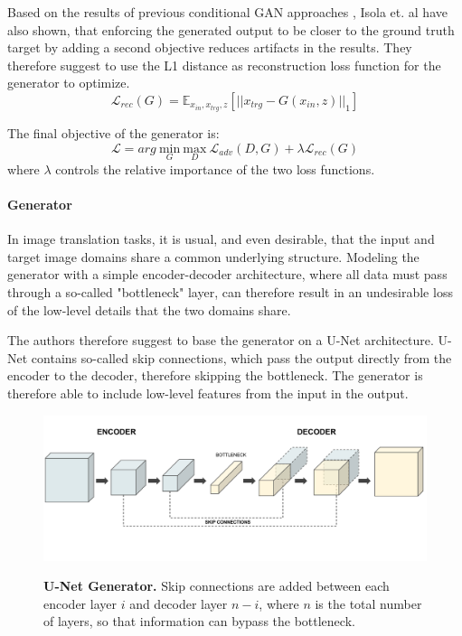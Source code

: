 \documentclass{article}
\begin{document}
Based on the results of previous conditional GAN approaches \cite{pathak_context_2016}, Isola et. al \cite{isola_image--image_2016} have also shown, that enforcing the generated output to be closer to the ground truth target by adding a second objective reduces artifacts in the results. They therefore suggest to use the L1 distance as reconstruction loss function for the generator to optimize.
\begin{equation}
\mathcal{L}_{rec}(G) = \mathbb{E}_{x_{in},x_{trg},z}[||x_{trg}-G(x_{in},z)||_{1}]
\label{eq:pix2pix_loss_rec}
\end{equation}

The final objective of the generator is:
\begin{equation}
\mathcal{L} = arg \ \underset{G}{\mathrm{min}} \ \underset{D}{\mathrm{max}} \ \mathcal{L}_{adv}(D,G) + \lambda \mathcal{L}_{rec}(G)
\end{equation}
where $\lambda$ controls the relative importance of the two loss functions.


\paragraph{Generator}
In image translation tasks, it is usual, and even desirable, that the input and target image domains share a common underlying structure. Modeling the generator with a simple encoder-decoder architecture, where all data must pass through a so-called "bottleneck" layer, can therefore result in an undesirable loss of the low-level details that the two domains share. 

The authors therefore suggest to base the generator on a U-Net architecture. U-Net contains so-called skip connections, which pass the output directly from the encoder to the decoder, therefore skipping the bottleneck. The generator is therefore able to include low-level features from the input in the output.

\begin{figure}[h]
\centering
{\includegraphics[width=\linewidth]{GAN/u-net}}
\caption{\label{fig:u-net} \textbf{U-Net Generator.} Skip connections are added between each encoder layer $i$ and decoder layer $n - i$, where $n$ is the total number of layers, so that information can bypass the bottleneck.}
\end{figure}
\end{document}
